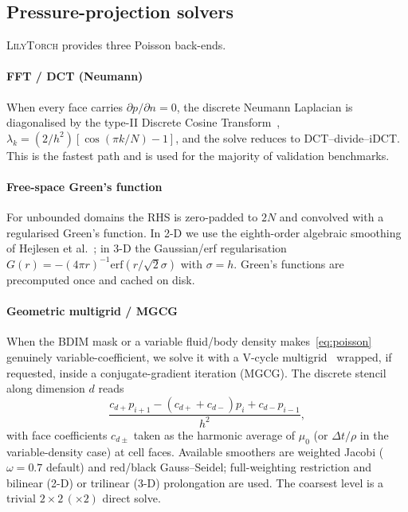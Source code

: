 \documentclass[journal,twoside,10pt]{IEEEtran}
\newcommand{\lilytorch}{\textsc{LilyTorch}\xspace}
\begin{document}
\subsection{Pressure-projection solvers}\label{sec:poisson}

\lilytorch provides three Poisson back-ends.

\paragraph{FFT / DCT (Neumann)}  When every face carries
$\partial p/\partial n{=}0$, the discrete Neumann Laplacian is
diagonalised by the type-II Discrete Cosine
Transform~\cite{makhoul1980dct},
$\lambda_k=(2/h^2)[\cos(\pi k/N)-1]$, and the solve reduces to
DCT--divide--iDCT.  This is the fastest path and is used for the
majority of validation benchmarks.

\paragraph{Free-space Green's function}  For unbounded domains the
RHS is zero-padded to $2N$ and convolved with a regularised Green's
function.  In 2-D we use the eighth-order algebraic smoothing of
Hejlesen et al.~\cite{hejlesen2013high}; in 3-D the Gaussian/erf
regularisation $G(r)=-(4\pi r)^{-1}\mathrm{erf}(r/\sqrt 2\sigma)$
with $\sigma{=}h$.  Green's functions are precomputed once and cached
on disk.

\paragraph{Geometric multigrid / MGCG}  When the BDIM mask or a
variable fluid/body density makes~\eqref{eq:poisson} genuinely
variable-coefficient, we solve it with a V-cycle
multigrid~\cite{trottenberg2001multigrid} wrapped, if requested,
inside a conjugate-gradient iteration (MGCG).  The discrete stencil
along dimension $d$ reads
\begin{equation*}
  \frac{c_{d+}p_{i+1}-(c_{d+}+c_{d-})p_{i}+c_{d-}p_{i-1}}{h^{2}},
\end{equation*}
with face coefficients $c_{d\pm}$ taken as the harmonic average of
$\mu_0$ (or $\Delta t/\rho$ in the variable-density case) at cell
faces.  Available smoothers are weighted Jacobi
($\omega{=}0.7$ default) and red/black Gauss--Seidel; full-weighting
restriction and bilinear (2-D) or trilinear (3-D) prolongation are
used.  The coarsest level is a trivial $2\times 2\,(\times 2)$ direct
solve.
\end{document}
